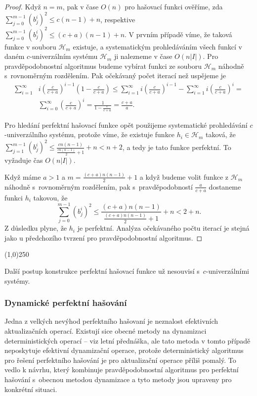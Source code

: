 \documentclass[a4paper,12pt]{article}
\newenvironment{myproof}{
  \begin{proof}
    
  }{
  \end{proof}
  \begin{center}
   \line(1,0){250}
   \end{center}
  }
\begin{document}
\begin{myproof}Když $n=m$, pak v čase $O(n)$ pro  
hašovací funkci ověříme, zda $\sum_{j=0}^{m-1}(b^
i_j)^2\le c(n-1)+n$, respektive 
$\sum_{j=0}^{m-1}(b^i_j)^2\le (c+a)(n-1)+n$.  V prvním případě víme, že taková 
funkce v souboru $\mathcal H_m$ existuje, a systematickým prohledáváním 
všech funkcí v daném $c$-univerzálním systému $\mathcal H_
m$ ji nalezneme 
v čase $O(n|I|)$.  Pro pravděpodobnostní algoritmus budeme 
vybírat funkci ze souboru $\mathcal H_m$ náhodně s~rovnoměrným 
rozdělením.  Pak očekávaný počet iterací než uspějeme je 
\begin{align*}\sum_{i=1}^{\infty}&i(\frac c{c+a})^{i-1}(1-\frac c{c+a})
\le\sum_{i=1}^{\infty}i(\frac c{c+a})^{i-1}-\sum_{i=1}^{\infty}i(\frac 
c{c+a})^i=\\
&\sum_{i=0}^{\infty}(\frac c{c+a})^i=\frac 1{1-\frac c{c+a}}=\frac {c
+a}a.\end{align*}

Pro hledání perfektní hašovací funkce opět použijeme 
syste\-ma\-tické prohledávání $c$-univer\-zál\-ního systému, protože 
víme, že existuje funkce $h_i\in \mathcal H_m$ taková, že 
$\sum_{j=1}^{m-1}(b^i_j)^2\le\frac {cn(n-1)}{\frac {cn(n-1)}2+1}+
n<n+2$, a tedy je tato funkce perfektní. 
To vyžaduje čas $O(n|I|)$. 

Když máme $a>1$ a $m=\frac {(c+a)n(n-1)}2+1$ 
a když budeme volit funkce z $\mathcal H_m$ 
náhodně s~rovnoměrným rozdělením, pak s~pravděpodobností 
$\frac a{c+a}$ do\-sta\-ne\-me funkci $h_i$ takovou, že 
$$\sum_{j=0}^{m-1}(b^i_j)^2\le\frac {(c+a)n(n-1)}{\frac {(c+a)n(n
-1)}2+1}+n<2+n.$$
Z důsledku plyne, že $h_i$ je perfektní.  Analýza 
očekávaného počtu iterací je stejná jako u předchozího tvrzení 
pro pravděpodobnostní algoritmus. 
\end{myproof}

Další postup konstrukce perfektní hašovací funkce už 
nesouvisí s~$c$-univerzálními systémy. 

\subsubsection{Dynamické perfektní hašování}

Jedna z velkých nevýhod perfektního hašovaní je 
neznalost efektivních aktualizačních ope\-rací. Existují sice 
obecné meto\-dy na dynamizaci deterministických operací -- viz 
letní přednáš\-ka, ale tato metoda v tomto případě neposkytuje 
efektivní dynamizační operace, protože deterministický 
algoritmus pro ře\-še\-ní perfektního hašování je pro 
aktualizační ope\-race příliš pomalý. To vedlo k návrhu, 
který kombinuje pravděpodobnostní algoritmus pro perfektní 
hašování s~obecnou metodou dynami\-za\-ce a tyto metody jsou 
upraveny pro konkrétní situaci. 
\end{document}
